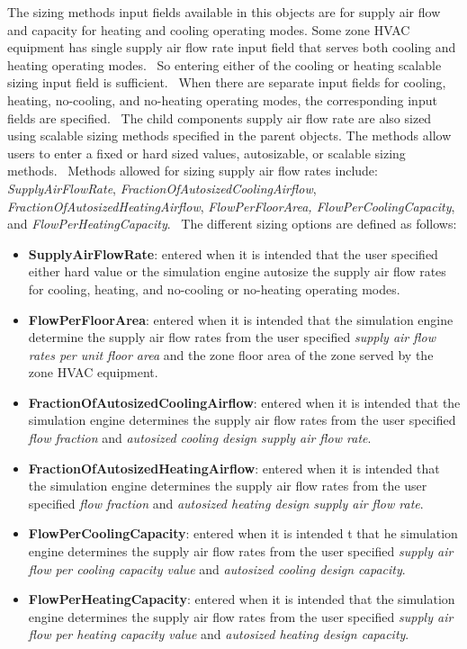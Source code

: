 The sizing methods input fields available in this objects are for supply air flow and capacity for heating and cooling operating modes. Some zone HVAC equipment has single supply air flow rate input field that serves both cooling and heating operating modes.~ So entering either of the cooling or heating scalable sizing input field is sufficient.~ When there are separate input fields for cooling, heating, no-cooling, and no-heating operating modes, the corresponding input fields are specified.~ The child components supply air flow rate are also sized using scalable sizing methods specified in the parent objects. The methods allow users to enter a fixed or hard sized values, autosizable, or scalable sizing methods.~ Methods allowed for sizing supply air flow rates include: \emph{SupplyAirFlowRate}, \emph{FractionOfAutosizedCoolingAirflow}, \emph{FractionOfAutosizedHeatingAirflow}, \emph{FlowPerFloorArea, FlowPerCoolingCapacity}, and \emph{FlowPerHeatingCapacity}.~ The different sizing options are defined as follows:

\begin{itemize}
\item
  \textbf{SupplyAirFlowRate}: entered when it is intended that the user specified either hard value or the simulation engine autosize the supply air flow rates for cooling, heating, and no-cooling or no-heating operating modes.
\item
  \textbf{FlowPerFloorArea}: entered when it is intended that the simulation engine determine the supply air flow rates from the user specified \emph{supply air flow rates per unit floor area} and the zone floor area of the zone served by the zone HVAC equipment.
\item
  \textbf{FractionOfAutosizedCoolingAirflow}: entered when it is intended that the simulation engine determines the supply air flow rates from the user specified \emph{flow fraction} and \emph{autosized cooling design supply air flow rate}.
\item
  \textbf{FractionOfAutosizedHeatingAirflow}: entered when it is intended that the simulation engine determines the supply air flow rates from the user specified \emph{flow fraction} and \emph{autosized heating design supply air flow rate}.
\item
  \textbf{FlowPerCoolingCapacity}: entered when it is intended t that he simulation engine determines the supply air flow rates from the user specified \emph{supply air flow per cooling capacity value} and \emph{autosized cooling design capacity}.
\item
  \textbf{FlowPerHeatingCapacity}: entered when it is intended that the simulation engine determines the supply air flow rates from the user specified \emph{supply air flow per heating capacity value} and \emph{autosized heating design capacity}.
\end{itemize}

